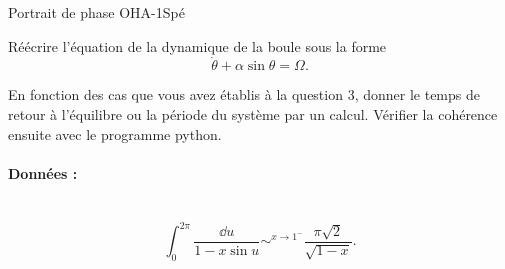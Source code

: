 \begin{exercise}{Portrait de phase OHA}{-1}{Spé}
\begin{questions}
    
    \question Réécrire l'équation de la dynamique de la boule sous la forme
    \begin{equation}
        \dot{\theta} + \alpha\sin\theta = \Omega.
    \end{equation}
    
    \question En fonction des cas que vous avez établis à la question 3, donner le temps de retour à l'équilibre ou la période du système par un calcul. Vérifier la cohérence ensuite avec le programme python.
    
\end{questions}

\paragraph{Données :}~\\
$$\int_0^{2\pi} \dfrac{\dd{u}}{1 - x \sin u} \sim^{x \rightarrow 1^-} \dfrac{\pi\sqrt{2}}{\sqrt{1-x}}.$$

\end{exercise}
